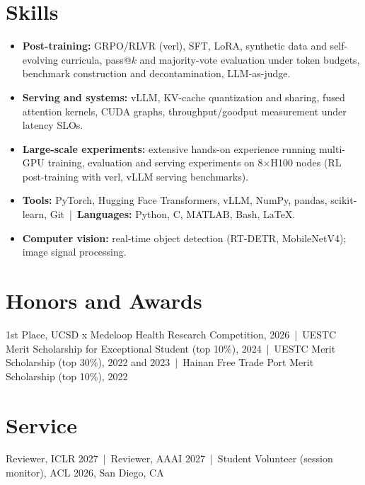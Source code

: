 \documentclass[10pt,letterpaper]{article}
\begin{document}
\section{Skills}
\begin{itemize}
  \item \textbf{Post-training:} GRPO/RLVR (verl), SFT, LoRA, synthetic data and self-evolving curricula, pass@$k$ and majority-vote evaluation under token budgets, benchmark construction and decontamination, LLM-as-judge.
  \item \textbf{Serving and systems:} vLLM, KV-cache quantization and sharing, fused attention kernels, CUDA graphs, throughput/goodput measurement under latency SLOs.
  \item \textbf{Large-scale experiments:} extensive hands-on experience running multi-GPU training, evaluation and serving experiments on 8$\times$H100 nodes (RL post-training with verl, vLLM serving benchmarks).
  \item \textbf{Tools:} PyTorch, Hugging Face Transformers, vLLM, NumPy, pandas, scikit-learn, Git \,|\, \textbf{Languages:} Python, C, MATLAB, Bash, \LaTeX.
  \item \textbf{Computer vision:} real-time object detection (RT-DETR, MobileNetV4); image signal processing.
\end{itemize}

\section{Honors and Awards}
1st Place, UCSD x Medeloop Health Research Competition, 2026 \,|\, UESTC Merit Scholarship for Exceptional Student (top 10\%), 2024 \,|\, UESTC Merit Scholarship (top 30\%), 2022 and 2023 \,|\, Hainan Free Trade Port Merit Scholarship (top 10\%), 2022

\section{Service}
Reviewer, ICLR 2027 \,|\, Reviewer, AAAI 2027 \,|\, Student Volunteer (session monitor), ACL 2026, San Diego, CA
\end{document}
